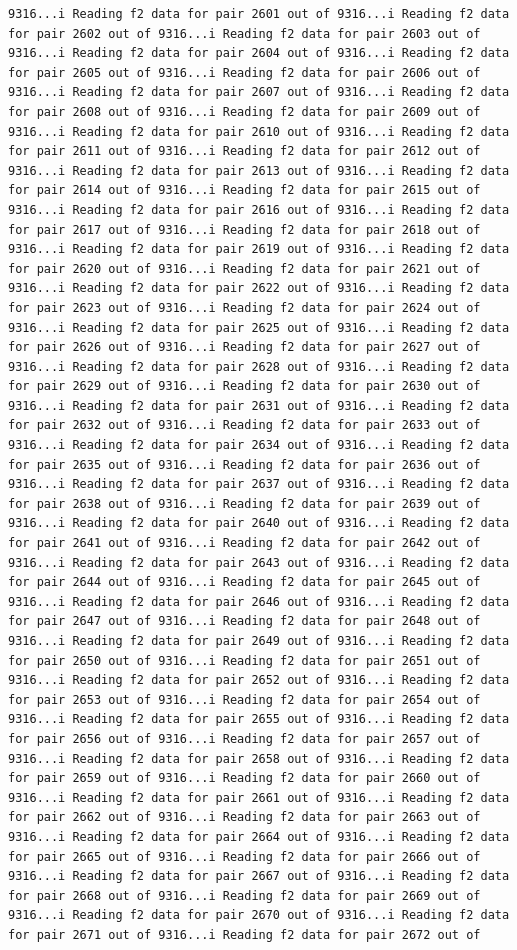 \documentclass[
]{article}
\begin{document}
\begin{verbatim}
9316...i Reading f2 data for pair 2601 out of 9316...i Reading f2 data for pair 2602 out of 9316...i Reading f2 data for pair 2603 out of 9316...i Reading f2 data for pair 2604 out of 9316...i Reading f2 data for pair 2605 out of 9316...i Reading f2 data for pair 2606 out of 9316...i Reading f2 data for pair 2607 out of 9316...i Reading f2 data for pair 2608 out of 9316...i Reading f2 data for pair 2609 out of 9316...i Reading f2 data for pair 2610 out of 9316...i Reading f2 data for pair 2611 out of 9316...i Reading f2 data for pair 2612 out of 9316...i Reading f2 data for pair 2613 out of 9316...i Reading f2 data for pair 2614 out of 9316...i Reading f2 data for pair 2615 out of 9316...i Reading f2 data for pair 2616 out of 9316...i Reading f2 data for pair 2617 out of 9316...i Reading f2 data for pair 2618 out of 9316...i Reading f2 data for pair 2619 out of 9316...i Reading f2 data for pair 2620 out of 9316...i Reading f2 data for pair 2621 out of 9316...i Reading f2 data for pair 2622 out of 9316...i Reading f2 data for pair 2623 out of 9316...i Reading f2 data for pair 2624 out of 9316...i Reading f2 data for pair 2625 out of 9316...i Reading f2 data for pair 2626 out of 9316...i Reading f2 data for pair 2627 out of 9316...i Reading f2 data for pair 2628 out of 9316...i Reading f2 data for pair 2629 out of 9316...i Reading f2 data for pair 2630 out of 9316...i Reading f2 data for pair 2631 out of 9316...i Reading f2 data for pair 2632 out of 9316...i Reading f2 data for pair 2633 out of 9316...i Reading f2 data for pair 2634 out of 9316...i Reading f2 data for pair 2635 out of 9316...i Reading f2 data for pair 2636 out of 9316...i Reading f2 data for pair 2637 out of 9316...i Reading f2 data for pair 2638 out of 9316...i Reading f2 data for pair 2639 out of 9316...i Reading f2 data for pair 2640 out of 9316...i Reading f2 data for pair 2641 out of 9316...i Reading f2 data for pair 2642 out of 9316...i Reading f2 data for pair 2643 out of 9316...i Reading f2 data for pair 2644 out of 9316...i Reading f2 data for pair 2645 out of 9316...i Reading f2 data for pair 2646 out of 9316...i Reading f2 data for pair 2647 out of 9316...i Reading f2 data for pair 2648 out of 9316...i Reading f2 data for pair 2649 out of 9316...i Reading f2 data for pair 2650 out of 9316...i Reading f2 data for pair 2651 out of 9316...i Reading f2 data for pair 2652 out of 9316...i Reading f2 data for pair 2653 out of 9316...i Reading f2 data for pair 2654 out of 9316...i Reading f2 data for pair 2655 out of 9316...i Reading f2 data for pair 2656 out of 9316...i Reading f2 data for pair 2657 out of 9316...i Reading f2 data for pair 2658 out of 9316...i Reading f2 data for pair 2659 out of 9316...i Reading f2 data for pair 2660 out of 9316...i Reading f2 data for pair 2661 out of 9316...i Reading f2 data for pair 2662 out of 9316...i Reading f2 data for pair 2663 out of 9316...i Reading f2 data for pair 2664 out of 9316...i Reading f2 data for pair 2665 out of 9316...i Reading f2 data for pair 2666 out of 9316...i Reading f2 data for pair 2667 out of 9316...i Reading f2 data for pair 2668 out of 9316...i Reading f2 data for pair 2669 out of 9316...i Reading f2 data for pair 2670 out of 9316...i Reading f2 data for pair 2671 out of 9316...i Reading f2 data for pair 2672 out of 
\end{verbatim}
\end{document}
